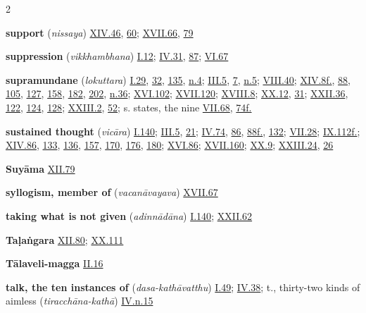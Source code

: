 \begin{multicols}{2}
\begin{vismHanging}
\par\textbf{support} (\emph{nissaya}) \hyperlink{XIV.46}{XIV.46}{}, \hyperlink{XIV.60}{60}{}; \hyperlink{XVII.66}{XVII.66}{}, \hyperlink{XVII.79}{79}{}
\par\textbf{suppression} (\emph{vikkhambhana}) \hyperlink{I.12}{I.12}{}; \hyperlink{IV.31}{IV.31}{}, \hyperlink{IV.87}{87}{}; \hyperlink{VI.67}{VI.67}{}
\par\textbf{supramundane} (\emph{lokuttara}) \hyperlink{I.29}{I.29}{}, \hyperlink{I.32}{32}{}, \hyperlink{I.135}{135}{}, \hyperlink{I.n4}{n.4}{}; \hyperlink{III.5}{III.5}{}, \hyperlink{III.7}{7}{}, \hyperlink{III.n5}{n.5}{}; \hyperlink{VIII.40}{VIII.40}{}; \hyperlink{XIV.8}{XIV.8f.}{}, \hyperlink{XIV.88}{88}{}, \hyperlink{XIV.105}{105}{}, \hyperlink{XIV.127}{127}{}, \hyperlink{XIV.158}{158}{}, \hyperlink{XIV.182}{182}{}, \hyperlink{XIV.202}{202}{}, \hyperlink{XIV.n36}{n.36}{}; \hyperlink{XVI.102}{XVI.102}{}; \hyperlink{XVII.120}{XVII.120}{}; \hyperlink{XVIII.8}{XVIII.8}{}; \hyperlink{XX.12}{XX.12}{}, \hyperlink{XX.31}{31}{}; \hyperlink{XXII.36}{XXII.36}{}, \hyperlink{XXII.122}{122}{}, \hyperlink{XXII.124}{124}{}, \hyperlink{XXII.128}{128}{}; \hyperlink{XXIII.2}{XXIII.2}{}, \hyperlink{XXIII.52}{52}{}; s. states, the nine \hyperlink{VII.68}{VII.68}{}, \hyperlink{VII.74}{74f.}{}
\par\textbf{sustained thought} (\emph{vicāra}) \hyperlink{I.140}{I.140}{}; \hyperlink{III.5}{III.5}{}, \hyperlink{III.21}{21}{}; \hyperlink{IV.74}{IV.74}{}, \hyperlink{IV.86}{86}{}, \hyperlink{IV.88}{88f.}{}, \hyperlink{IV.132}{132}{}; \hyperlink{VII.28}{VII.28}{}; \hyperlink{IX.112}{IX.112f.}{}; \hyperlink{XIV.86}{XIV.86}{}, \hyperlink{XIV.133}{133}{}, \hyperlink{XIV.136}{136}{}, \hyperlink{XIV.157}{157}{}, \hyperlink{XIV.170}{170}{}, \hyperlink{XIV.176}{176}{}, \hyperlink{XIV.180}{180}{}; \hyperlink{XVI.86}{XVI.86}{}; \hyperlink{XVII.160}{XVII.160}{}; \hyperlink{XX.9}{XX.9}{}; \hyperlink{XXIII.24}{XXIII.24}{}, \hyperlink{XXIII.26}{26}{}
\par\textbf{Suyāma} \hyperlink{XII.79}{XII.79}{}
\par\textbf{syllogism, member of} (\emph{vacanāvayava}) \hyperlink{XVII.67}{XVII.67}{}
\par\textbf{taking what is not given} (\emph{adinnādāna}) \hyperlink{I.140}{I.140}{}; \hyperlink{XXII.62}{XXII.62}{}
\par\textbf{Taḷaṅgara} \hyperlink{XII.80}{XII.80}{}; \hyperlink{XX.111}{XX.111}{}
\par\textbf{Tālaveli-magga} \hyperlink{II.16}{II.16}{}
\par\textbf{talk, the ten instances of} (\emph{dasa-kathāvatthu}) \hyperlink{I.49}{I.49}{}; \hyperlink{IV.38}{IV.38}{}; t., thirty-two kinds of aimless (\emph{tiracchāna-kathā}) \hyperlink{IV.n15}{IV.n.15}{}

\end{vismHanging}
\end{multicols}
